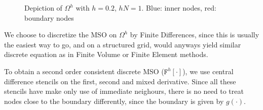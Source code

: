 \documentclass[11pt]{scrartcl}
\newcommand{\mSurfDisc}[1]{\ensuremath{\mathtt{F}^h\left[#1\right]}}
\begin{document}
\begin{figure}[h!]
	\centering
	\caption[Depiction of $\Omega^h$ with $N=5$, $hN=1$]{Depiction of $\Omega^h$ with $h=0.2$, $hN=1$. Blue: inner nodes, red: boundary nodes}
\end{figure}

We choose to discretize the MSO on $\Omega^h$ by Finite Differences, since this is usually the easiest way to go, and on a structured grid, would anyways yield similar discrete equation as in Finite Volume or Finite Element methods.

To obtain a second order consistent discrete MSO (\mSurfDisc{\cdot}), we use central difference stencils on the first, second and mixed derivative. Since all these stencils have make only use of immediate neighours, there is no need to treat nodes close to the boundary differently, since the boundary is given by $g(\cdot)$.
\end{document}
